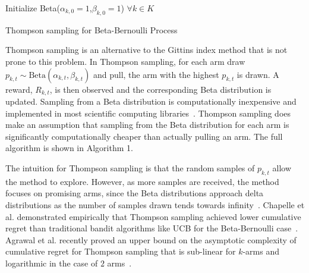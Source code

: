 \documentclass[10pt, conference]{ieeeconf}      %
\begin{document}
\begin{algorithm}
 Initialize Beta($\alpha_{k,0}=1$,$\beta_{k,0}=1$) $\forall k \in K$ \\
 \caption{Thompson sampling for Beta-Bernoulli Process}
\end{algorithm}

Thompson sampling is an alternative to the Gittins index method that is not prone to this problem. 
In Thompson sampling, for each arm draw $p_{k,t} \sim \mbox{Beta}(\alpha_{k,t},\beta_{k,t})$ and pull, the arm with the
highest $p_{k,t}$ is drawn.
A reward, $R_{k,t}$, is then observed and the corresponding Beta distribution is updated. Sampling from a Beta
distribution is computationally inexpensive and implemented  in most scientific computing libraries~\cite{MATLAB:2010}. Thompson sampling does make an assumption that sampling from the Beta distribution for each arm is significantly computationally cheaper than actually pulling an arm. The full algorithm is shown in Algorithm 1.

The intuition for Thompson sampling is that the random samples of $p_{k,t}$ allow the method to explore. However, as
more samples are received, the method focuses on promising arms, since the Beta distributions approach delta
distributions as the number of samples drawn tends towards infinity~\cite{agrawal2011analysis}. Chapelle et al. demonstrated empirically that Thompson sampling achieved lower cumulative regret than traditional bandit algorithms like UCB for the Beta-Bernoulli case~\cite{chapelle2011empirical}. Agrawal et al. recently proved an upper bound on the asymptotic complexity of  cumulative regret for  Thompson sampling that is sub-linear for $k$-arms and logarithmic in the case of $2$ arms~\cite{agrawal2011analysis}. 
\end{document}
